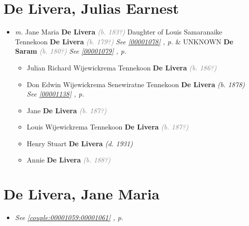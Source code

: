 \documentclass[10pt, openany]{book}
\begin{document}
\chapter{De Livera, Julias Earnest}
\label{00001059}
\textcolor{slmaroon}{\textit{}}
\begin{itemize}
\item{\textit{m.} Jane Maria \textbf{De Livera} \textcolor{gray}{\textit{(b. 183?)}} Daughter of  Louis Samaranaike Tennekoon \textbf{De Livera} \textcolor{gray}{\textit{(b. 179?)}} \textcolor{slteal}{\textit{See  \autoref{00001078} \textit{, p. \pageref{00001078} }}}  \&  UNKNOWN \textbf{De Saram} \textcolor{gray}{\textit{(b. 180?)}} \textcolor{slteal}{\textit{See  \autoref{00001079} \textit{, p. \pageref{00001079} }}}   \label{couple:00001059:00001061} \begin{itemize}
\item{Julian Richard Wijewickrema Tennekoon \textbf{De Livera} \textcolor{gray}{\textit{(b. 186?)}}
     }
\item{Don Edwin Wijewickrema Senewiratne Tennekoon \textbf{De Livera} \textcolor{slorange}{\textit{(b. 1878)}} \textcolor{slteal}{\textit{See  \autoref{00001138} \textit{, p. \pageref{00001138} }}}}
\item{Jane \textbf{De Livera} \textcolor{gray}{\textit{(b. 187?)}}
  }
\item{Louis Wijewickrema Tennekoon \textbf{De Livera} \textcolor{gray}{\textit{(b. 187?)}}
    }
\item{Henry Stuart \textbf{De Livera} \textcolor{slorange}{\textit{(d. 1931)}}
   }
\item{Annie \textbf{De Livera} \textcolor{gray}{\textit{(b. 188?)}}
  }
\end{itemize}}
\end{itemize}
   
\chapter{De Livera, Jane Maria}
\label{00001061}
\textcolor{slmaroon}{\textit{}}
\begin{itemize}
\item{\textcolor{slteal}{\textit{See  \autoref{couple:00001059:00001061} \textit{, p. \pageref{couple:00001059:00001061} }}}}
\end{itemize}
   
\end{document}
